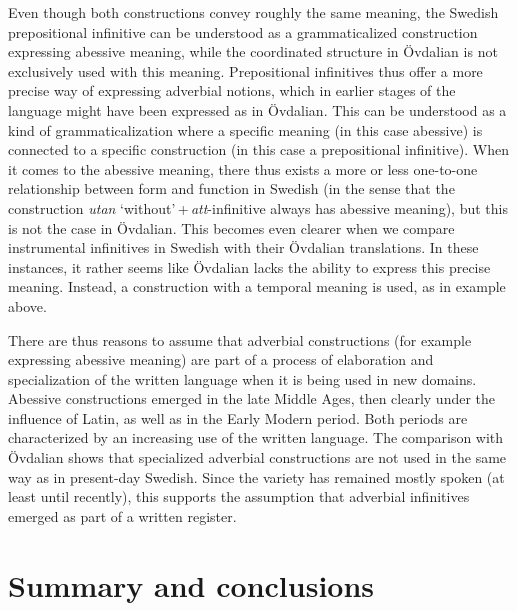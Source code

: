 \documentclass[output=paper]{langscibook}
\begin{document}
Even though both constructions convey roughly the same meaning, the Swedish prepositional infinitive can be understood as a grammaticalized construction expressing abessive meaning, while the coordinated structure in Övdalian is not exclusively used with this meaning. Prepositional infinitives thus offer a more precise way of expressing adverbial notions, which in earlier stages of the language might have been expressed as in Övdalian. This can be understood as a kind of grammaticalization where a specific meaning (in this case abessive) is connected to a specific construction (in this case a prepositional infinitive). When it comes to the abessive meaning, there thus exists a more or less one-to-one relationship between form and function in Swedish (in the sense that the construction \textit{utan} ‘without’\,+\,\textit{att}-infinitive always has abessive meaning), but this is not the case in Övdalian. This becomes even clearer when we compare instrumental infinitives in Swedish with their Övdalian translations. In these instances, it rather seems like Övdalian lacks the ability to express this precise meaning. Instead, a construction with a temporal meaning is used, as in example  above. 



There are thus reasons to assume that adverbial constructions (for example expressing abessive meaning) are part of a process of elaboration and specialization of the written language when it is being used in new domains. Abessive constructions emerged in the late Middle Ages, then clearly under the influence of Latin, as well as in the Early Modern period. Both periods are characterized by an increasing use of the written language. The comparison with Övdalian shows that specialized adverbial constructions are not used in the same way as in present-day Swedish. Since the variety has remained mostly spoken (at least until recently), this supports the assumption that adverbial infinitives emerged as part of a written register.  


\section{Summary and conclusions}\label{sec:kalm:6}
\end{document}
